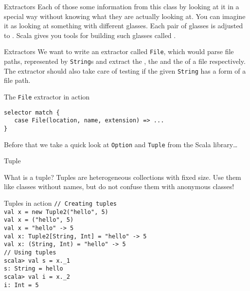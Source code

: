 \begin{frame}{Extractors}
Each of those  some information from this class by
looking at it in a special way without knowing what they are actually looking
at. You can imagine it as looking  at something with different glasses. Each
pair of glasses is adjusted to . Scala
gives you tools for building such glasses called .
\end{frame}

\begin{frame}[fragile]{Extractors}
We want to write an extractor called \lstinline!File!, which would parse file
paths, represented by \lstinline!String!s and extract the ,
the  and the  of a file respectively.
The extractor should also take care of testing if the given \lstinline!String!
has a form of a file path.
\pause
\begin{exampleblock}{The \lstinline!File! extractor in action}
\begin{lstlisting}
selector match {
   case File(location, name, extension) => ...
}
\end{lstlisting}
\end{exampleblock}
\pause
Before that we take a quick look at \lstinline!Option! and \lstinline!Tuple!
from the Scala library\ldots
\end{frame}

\begin{frame}[fragile]{Tuple}
\begin{block}{What is a tuple?}
Tuples are heterogeneous collections with fixed size. Use them like classes
without names, but do not confuse them with anonymous classes!
\end{block}
\pause
\begin{exampleblock}{Tuples in action}
\lstinline!// Creating tuples!\\
\lstinline!val x = new Tuple2("hello", 5)!\\
\lstinline!val x = ("hello", 5)!\\
\lstinline!val x = "hello" -> 5!\\
\lstinline!val x: Tuple2[String, Int] = "hello" -> 5!\\
\lstinline!val x: (String, Int) = "hello" -> 5!\\
\lstinline!// Using tuples!\\
\lstinline!scala> val s = x._1!\\
\lstinline!s: String = hello!\\
\lstinline!scala> val i = x._2!\\
\lstinline!i: Int = 5!
\end{exampleblock}
\end{frame}

